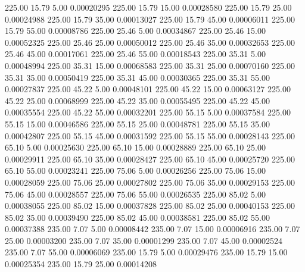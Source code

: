     225.00     15.79      5.00     0.00020295
    225.00     15.79     15.00     0.00028580
    225.00     15.79     25.00     0.00024988
    225.00     15.79     35.00     0.00013027
    225.00     15.79     45.00     0.00006011
    225.00     15.79     55.00     0.00008786
    225.00     25.46      5.00     0.00034867
    225.00     25.46     15.00     0.00052325
    225.00     25.46     25.00     0.00050012
    225.00     25.46     35.00     0.00032653
    225.00     25.46     45.00     0.00017061
    225.00     25.46     55.00     0.00018543
    225.00     35.31      5.00     0.00048994
    225.00     35.31     15.00     0.00068583
    225.00     35.31     25.00     0.00070160
    225.00     35.31     35.00     0.00050419
    225.00     35.31     45.00     0.00030365
    225.00     35.31     55.00     0.00027837
    225.00     45.22      5.00     0.00048101
    225.00     45.22     15.00     0.00063127
    225.00     45.22     25.00     0.00068999
    225.00     45.22     35.00     0.00055495
    225.00     45.22     45.00     0.00035554
    225.00     45.22     55.00     0.00032201
    225.00     55.15      5.00     0.00037584
    225.00     55.15     15.00     0.00046586
    225.00     55.15     25.00     0.00048781
    225.00     55.15     35.00     0.00042807
    225.00     55.15     45.00     0.00031592
    225.00     55.15     55.00     0.00028143
    225.00     65.10      5.00     0.00025630
    225.00     65.10     15.00     0.00028889
    225.00     65.10     25.00     0.00029911
    225.00     65.10     35.00     0.00028427
    225.00     65.10     45.00     0.00025720
    225.00     65.10     55.00     0.00023241
    225.00     75.06      5.00     0.00026256
    225.00     75.06     15.00     0.00028059
    225.00     75.06     25.00     0.00027802
    225.00     75.06     35.00     0.00029153
    225.00     75.06     45.00     0.00028557
    225.00     75.06     55.00     0.00026535
    225.00     85.02      5.00     0.00038055
    225.00     85.02     15.00     0.00037828
    225.00     85.02     25.00     0.00040153
    225.00     85.02     35.00     0.00039490
    225.00     85.02     45.00     0.00038581
    225.00     85.02     55.00     0.00037388
    235.00      7.07      5.00     0.00008442
    235.00      7.07     15.00     0.00006916
    235.00      7.07     25.00     0.00003200
    235.00      7.07     35.00     0.00001299
    235.00      7.07     45.00     0.00002524
    235.00      7.07     55.00     0.00006069
    235.00     15.79      5.00     0.00029476
    235.00     15.79     15.00     0.00025354
    235.00     15.79     25.00     0.00014208
